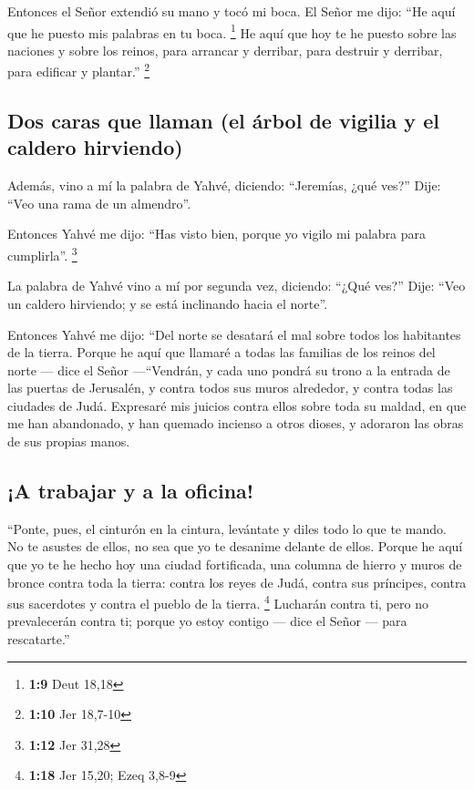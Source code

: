 \begin{paracol}{2}
 Entonces el Señor extendió su mano y tocó mi boca. El
Señor me dijo: ``He aquí que he puesto mis palabras en tu boca.
\footnote{\textbf{1:9} Deut 18,18}  He aquí que hoy te he
puesto sobre las naciones y sobre los reinos, para arrancar y derribar,
para destruir y derribar, para edificar y plantar.'' \footnote{\textbf{1:10}
  Jer 18,7-10}

\hypertarget{dos-caras-que-llaman-el-uxe1rbol-de-vigilia-y-el-caldero-hirviendo}{%
\subsection{Dos caras que llaman (el árbol de vigilia y el caldero
hirviendo)}\label{dos-caras-que-llaman-el-uxe1rbol-de-vigilia-y-el-caldero-hirviendo}}

 Además, vino a mí la palabra de Yahvé, diciendo:
``Jeremías, ¿qué ves?'' Dije: ``Veo una rama de un almendro''.

 Entonces Yahvé me dijo: ``Has visto bien, porque yo
vigilo mi palabra para cumplirla''. \footnote{\textbf{1:12} Jer 31,28}

 La palabra de Yahvé vino a mí por segunda vez, diciendo:
``¿Qué ves?'' Dije: ``Veo un caldero hirviendo; y se está inclinando
hacia el norte''.

 Entonces Yahvé me dijo: ``Del norte se desatará el mal
sobre todos los habitantes de la tierra.  Porque he aquí
que llamaré a todas las familias de los reinos del norte --- dice el
Señor ---``Vendrán, y cada uno pondrá su trono a la entrada de las
puertas de Jerusalén, y contra todos sus muros alrededor, y contra todas
las ciudades de Judá.  Expresaré mis juicios contra ellos
sobre toda su maldad, en que me han abandonado, y han quemado incienso a
otros dioses, y adoraron las obras de sus propias manos.

\hypertarget{a-trabajar-y-a-la-oficina}{%
\subsection{¡A trabajar y a la
oficina!}\label{a-trabajar-y-a-la-oficina}}

 ``Ponte, pues, el cinturón en la cintura, levántate y
diles todo lo que te mando. No te asustes de ellos, no sea que yo te
desanime delante de ellos.  Porque he aquí que yo te he
hecho hoy una ciudad fortificada, una columna de hierro y muros de
bronce contra toda la tierra: contra los reyes de Judá, contra sus
príncipes, contra sus sacerdotes y contra el pueblo de la tierra.
\footnote{\textbf{1:18} Jer 15,20; Ezeq 3,8-9}  Lucharán
contra ti, pero no prevalecerán contra ti; porque yo estoy contigo ---
dice el Señor --- para rescatarte.''


\end{paracol}
